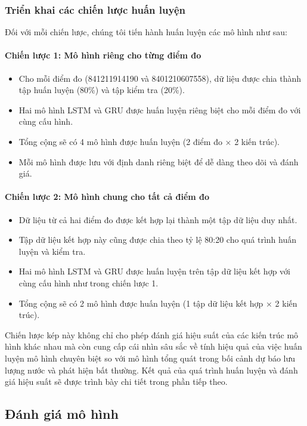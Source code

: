\subsubsection{Triển khai các chiến lược huấn luyện}

Đối với mỗi chiến lược, chúng tôi tiến hành huấn luyện các mô hình như sau:

\paragraph{Chiến lược 1: Mô hình riêng cho từng điểm đo}
\begin{itemize}
    \item Cho mỗi điểm đo (841211914190 và 8401210607558), dữ liệu được chia thành tập huấn luyện (80\%) và tập kiểm tra (20\%).
    \item Hai mô hình LSTM và GRU được huấn luyện riêng biệt cho mỗi điểm đo với cùng cấu hình.
    \item Tổng cộng sẽ có 4 mô hình được huấn luyện (2 điểm đo × 2 kiến trúc).
    \item Mỗi mô hình được lưu với định danh riêng biệt để dễ dàng theo dõi và đánh giá.
\end{itemize}

\paragraph{Chiến lược 2: Mô hình chung cho tất cả điểm đo}
\begin{itemize}
    \item Dữ liệu từ cả hai điểm đo được kết hợp lại thành một tập dữ liệu duy nhất.
    \item Tập dữ liệu kết hợp này cũng được chia theo tỷ lệ 80:20 cho quá trình huấn luyện và kiểm tra.
    \item Hai mô hình LSTM và GRU được huấn luyện trên tập dữ liệu kết hợp với cùng cấu hình như trong chiến lược 1.
    \item Tổng cộng sẽ có 2 mô hình được huấn luyện (1 tập dữ liệu kết hợp × 2 kiến trúc).
\end{itemize}

Chiến lược kép này không chỉ cho phép đánh giá hiệu suất của các kiến trúc mô hình khác nhau mà còn cung cấp cái nhìn sâu sắc về tính hiệu quả của việc huấn luyện mô hình chuyên biệt so với mô hình tổng quát trong bối cảnh dự báo lưu lượng nước và phát hiện bất thường. Kết quả của quá trình huấn luyện và đánh giá hiệu suất sẽ được trình bày chi tiết trong phần tiếp theo.

\subsection{Đánh giá mô hình}
